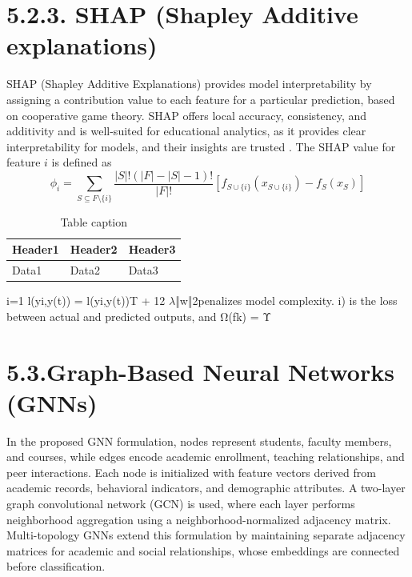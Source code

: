 \documentclass[twocolumn]{svjour3}
\begin{document}
\section{5.2.3. SHAP (Shapley Additive explanations)}
SHAP (Shapley Additive Explanations) provides model interpretability by assigning a contribution value to each feature for a particular prediction, based on cooperative game theory. SHAP offers local accuracy, consistency, and additivity and is well-suited for educational analytics, as it provides clear interpretability for models, and their insights are trusted \cite{ref1}. The SHAP value for feature $i$ is defined as
\begin{equation}
\phi_i = \sum_{S \subseteq F \setminus \{i\}} \frac{|S|!(|F| - |S| - 1)!}{|F|!} [f_{S \cup \{i\}}(x_{S \cup \{i\}}) - f_S(x_S)]
\end{equation}
\begin{table}
\centering
\caption{Table caption}
\begin{tabular}{lll}
\hline
Header1 & Header2 & Header3 \\
\hline
Data1 & Data2 & Data3 \\
\hline
\end{tabular}
\end{table}
i=1 l(yi,y(t)) = l(yi,y(t))T + 12
$\lambda$‖w‖2penalizes model complexity.
i) is the loss between actual and predicted outputs, and Ω(fk) = Υ

\section{5.3.Graph-Based Neural Networks (GNNs)}
In the proposed GNN formulation, nodes represent students, faculty members, and courses, while edges encode academic enrollment, teaching relationships, and peer interactions. Each node is initialized with feature vectors derived from academic records, behavioral indicators, and demographic attributes. A two-layer graph convolutional network (GCN) is used, where each layer performs neighborhood aggregation using a neighborhood-normalized adjacency matrix. Multi-topology GNNs extend this formulation by maintaining separate adjacency matrices for academic and social relationships, whose embeddings are connected before classification.
\end{document}
